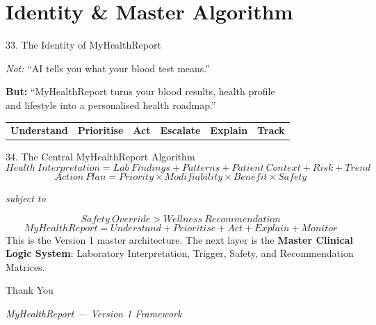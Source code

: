 \documentclass[10pt,aspectratio=169]{beamer}
\begin{document}
\section{Identity \& Master Algorithm}

\begin{frame}{33. The Identity of MyHealthReport}
\begin{center}
\small \textit{Not:} ``AI tells you what your blood test means.''

\vspace{6pt}
\large \textbf{But:} ``MyHealthReport turns your blood results, health profile\\ and lifestyle into a personalised health roadmap.''
\end{center}
\vspace{10pt}
\begin{center}
\begin{tabular}{cccccc}
\textbf{Understand} & \textbf{Prioritise} & \textbf{Act} & \textbf{Escalate} & \textbf{Explain} & \textbf{Track}
\end{tabular}
\end{center}
\end{frame}

\begin{frame}{34. The Central MyHealthReport Algorithm}
$$Health\ Interpretation = Lab\ Findings + Patterns + Patient\ Context + Risk + Trend$$
\vspace{4pt}
$$Action\ Plan = Priority \times Modifiability \times Benefit \times Safety$$
\vspace{4pt}
\begin{center}
\textit{subject to}
\end{center}
$$Safety\ Override > Wellness\ Recommendation$$
\vspace{4pt}
$$MyHealthReport = Understand + Prioritise + Act + Explain + Monitor$$
\vfill
\footnotesize \centering This is the Version 1 master architecture. The next layer is the \textbf{Master Clinical Logic System}: Laboratory Interpretation, Trigger, Safety, and Recommendation Matrices.
\end{frame}

\begin{frame}
\centering
\Huge Thank You
\vspace{10pt}

\normalsize \textit{MyHealthReport --- Version 1 Framework}
\end{frame}
\end{document}
